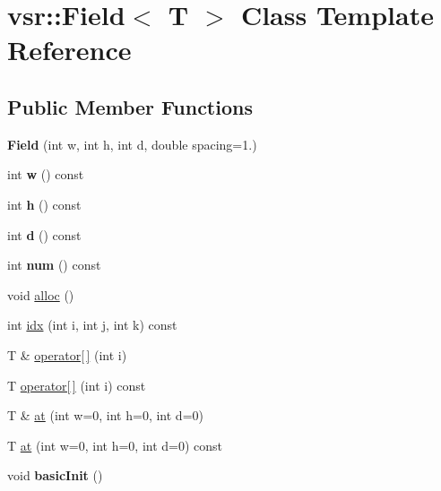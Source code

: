 \hypertarget{classvsr_1_1_field}{\section{vsr\-:\-:Field$<$ T $>$ Class Template Reference}
\label{classvsr_1_1_field}
}
\subsection*{Public Member Functions}
\begin{DoxyCompactItemize}
\item 
\hypertarget{classvsr_1_1_field_a130049d038b34d9c488540f3c356ecc6}{{\bfseries Field} (int w, int h, int d, double spacing=1.)}\label{classvsr_1_1_field_a130049d038b34d9c488540f3c356ecc6}

\item 
\hypertarget{classvsr_1_1_field_a824f1c0a527ef257cb14e0ab8306ad3d}{int {\bfseries w} () const }\label{classvsr_1_1_field_a824f1c0a527ef257cb14e0ab8306ad3d}

\item 
\hypertarget{classvsr_1_1_field_aca8ad40588a7956809d4606d7252f1ea}{int {\bfseries h} () const }\label{classvsr_1_1_field_aca8ad40588a7956809d4606d7252f1ea}

\item 
\hypertarget{classvsr_1_1_field_a049de6c110a0d216725da3dfcfc84e9f}{int {\bfseries d} () const }\label{classvsr_1_1_field_a049de6c110a0d216725da3dfcfc84e9f}

\item 
\hypertarget{classvsr_1_1_field_a37376318eb37dcb1f545c9880d2b2a3e}{int {\bfseries num} () const }\label{classvsr_1_1_field_a37376318eb37dcb1f545c9880d2b2a3e}

\item 
void \hyperlink{classvsr_1_1_field_a12f6322a1c6b4ae57232fb7f40d5c945}{alloc} ()
\item 
int \hyperlink{classvsr_1_1_field_a11f51b8f5630476ffeed4e533e477985}{idx} (int i, int j, int k) const 
\item 
T \& \hyperlink{classvsr_1_1_field_a1f032daa6ec59c3905244407b57ac1b7}{operator\mbox{[}$\,$\mbox{]}} (int i)
\item 
T \hyperlink{classvsr_1_1_field_a6159bb972b51b7bc0e2914ca0779a836}{operator\mbox{[}$\,$\mbox{]}} (int i) const 
\item 
T \& \hyperlink{classvsr_1_1_field_abbb3f5dfe8a27528d5fdd44b82960e6a}{at} (int w=0, int h=0, int d=0)
\item 
T \hyperlink{classvsr_1_1_field_ac8f13d0ff238a14d3af073a0166637a9}{at} (int w=0, int h=0, int d=0) const 
\item 
\hypertarget{classvsr_1_1_field_a1a24986a69cbca0e84b81203c2d3e538}{void {\bfseries basic\-Init} ()}\label{classvsr_1_1_field_a1a24986a69cbca0e84b81203c2d3e538}


\end{DoxyCompactItemize}
